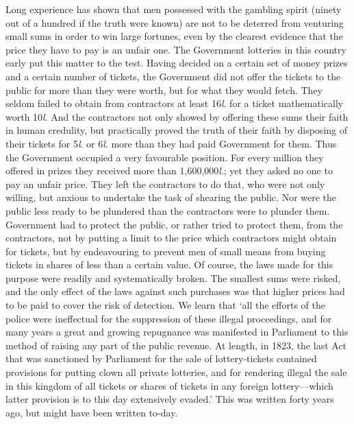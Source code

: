 \documentclass[letterpaper,12pt,oneside,openany]{memoir}
\begin{document}
Long experience has shown that men possessed with
the gambling spirit (ninety out of a hundred if the
truth were known) are not to be deterred from venturing
small sums in order to win large fortunes, even
by the clearest evidence that the price they have to
pay is an unfair one. The Government lotteries in
this country early put this matter to the test. Having
decided on a certain set of money prizes and a certain
number of tickets, the Government did not offer the
tickets to the public for more than they were worth,
but for what they would fetch. They seldom failed
to obtain from contractors at least 16\textit{l}. for a ticket
mathematically worth 10\textit{l}. And the contractors not
only showed by offering these sums their faith in
human credulity, but practically proved the truth of
their faith by disposing of their tickets for 5\textit{l}. or 6\textit{l}.
more than they had paid Government for them.
Thus the Government occupied a very favourable position.
For every million they offered in prizes they
received more than 1,600,000\textit{l}.; yet they asked no
one to pay an unfair price. They left the contractors
to do that, who were not only willing, but anxious to
undertake the task of shearing the public. Nor were
the public less ready to be plundered than the contractors
were to plunder them. Government had to
protect the public, or rather tried to protect them,
from the contractors, not by putting a limit to the
price which contractors might obtain for tickets, but
by endeavouring to prevent men of small means from
buying tickets in shares of less than a certain value.
Of course, the laws made for this purpose were readily
and systematically broken. The smallest sums were
risked, and the only effect of the laws against such
purchases was that higher prices had to be paid to
cover the risk of detection. We learn that `all the
efforts of the police were ineffectual for the suppression
of these illegal proceedings, and for many years a
great and growing repugnance was manifested in
Parliament to this method of raising any part of the
public revenue. At length, in 1823, the last Act that
was sanctioned by Parliament for the sale of lottery-tickets
contained provisions for putting clown all private
lotteries, and for rendering illegal the sale in this
kingdom of all tickets or shares of tickets in any
foreign lottery---which latter provision is to this day
extensively evaded.' This was written forty years ago,
but might have been written to-day.
\end{document}
